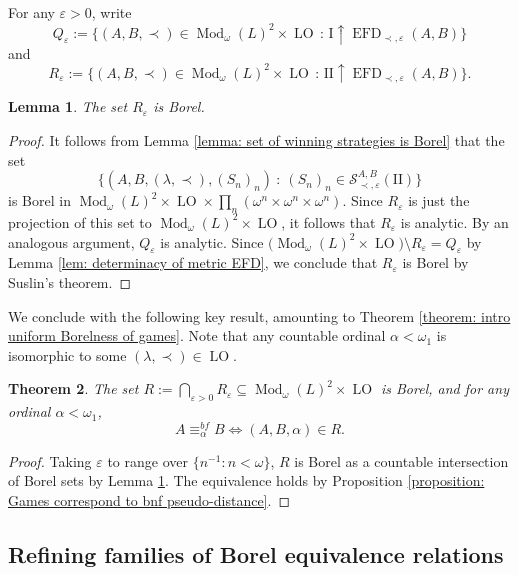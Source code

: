 \documentclass[12pt]{amsart}
\newtheorem{theorem}{Theorem}[section]
\newtheorem{lemma}[theorem]{Lemma}
\DeclareMathOperator{\EFD}{EFD}
\DeclareMathOperator{\Mod}{Mod}
\DeclareMathOperator{\LO}{LO}
\begin{document}
For any $\varepsilon>0$, write  
\[Q_\varepsilon:=\{(A,B,\prec)\in\Mod_\omega(L)^2\times\LO \, \colon \, \mathrm{I}\uparrow\EFD_{\prec,\varepsilon}(A,B)\}\]
and
\[R_\varepsilon:=\{(A,B,\prec)\in\Mod_\omega(L)^2\times\LO \, \colon \, \mathrm{II} \uparrow\EFD_{\prec,\varepsilon}(A,B)\}.\]

\begin{lemma}\label{lemma: Winning strategy Borel}
    The set $R_\varepsilon$ is Borel.
\end{lemma}
\begin{proof}
    It follows from Lemma \ref{lemma: set of winning strategies is Borel} that the set
    \[\big\{(A,B,(\lambda,\prec),(S_n)_n) \ \colon \ (S_n)_n\in \mathcal{S}_{\prec,\varepsilon}^{A,B}(\mathrm{II})\big\}\]
    is Borel in $\Mod_\omega(L)^2\times\LO\times\prod_n(\omega^n\times\omega^n\times\omega^n)$. Since $R_\varepsilon$ is just the projection of this set to $\Mod_\omega(L)^2\times\LO$, it follows that $R_\varepsilon$ is analytic.
    By an analogous argument, $Q_\varepsilon$ is analytic.
    Since $\big(\Mod_\omega(L)^2\times\LO\big)\setminus R_\varepsilon=Q_\varepsilon$ by Lemma \ref{lem: determinacy of metric EFD}, we conclude that $R_\varepsilon$ is Borel by Suslin's theorem.
\end{proof}

We conclude with the following key result, amounting to Theorem \ref{theorem: intro uniform Borelness of games}. Note that any countable ordinal $\alpha<\omega_1$ is isomorphic to some $(\lambda,\prec)\in\LO$.

\begin{theorem}\label{theorem:back-and-forth_is_uniformly_borel}
    The set $R:=\bigcap_{\varepsilon>0}R_\varepsilon\subseteq\Mod_\omega(L)^2\times\LO$
    is Borel, and for any ordinal $\alpha<\omega_1$,
    \[A\equiv_\alpha^{bf} B\iff (A,B,\alpha)\in R.\]
\end{theorem}

\begin{proof}
    Taking $\varepsilon$ to range over $\{n^{-1} \colon n<\omega\}$, $R$ is Borel as a countable intersection of Borel sets by Lemma \ref{lemma: Winning strategy Borel}. The equivalence holds by Proposition \ref{proposition: Games correspond to bnf pseudo-distance}.
\end{proof}

\subsection{Refining families of Borel equivalence relations}\label{subsection: barwise}
\end{document}
